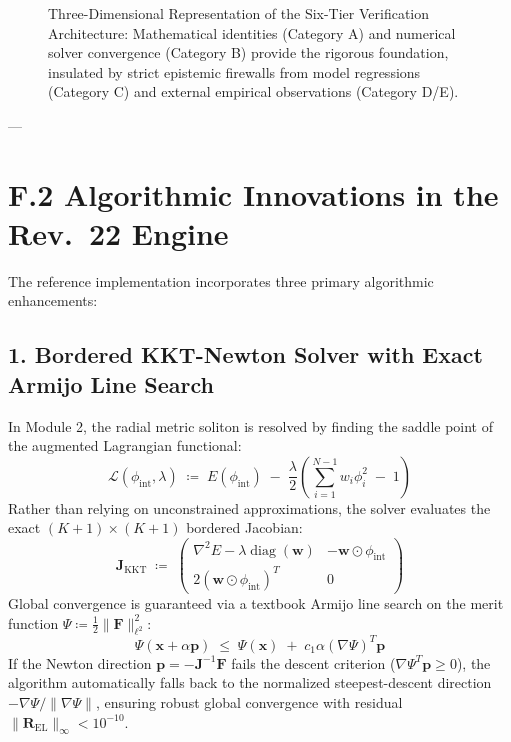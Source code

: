 \documentclass[
    12pt,
    a4paper,
    headings=normal,
    twoside=false,
    open=any,
    parskip=half
]{scrbook}
\begin{document}
\begin{figure}[htbp]
\caption{Three-Dimensional Representation of the Six-Tier Verification Architecture: Mathematical identities (Category A) and numerical solver convergence (Category B) provide the rigorous foundation, insulated by strict epistemic firewalls from model regressions (Category C) and external empirical observations (Category D/E).}
\label{fig:appF_verification_architecture_3d}
\end{figure}

---

\section{F.2 Algorithmic Innovations in the Rev.~22 Engine}
\label{sec:appF_algorithmic_innovations}

The reference implementation incorporates three primary algorithmic enhancements:

\subsection{1. Bordered KKT-Newton Solver with Exact Armijo Line Search}
In Module 2, the radial metric soliton is resolved by finding the saddle point of the augmented Lagrangian functional:
\begin{equation}
\mathcal{L}(\phi_{\text{int}}, \lambda) \;\coloneqq\; E(\phi_{\text{int}}) \;-\; \frac{\lambda}{2} \left( \sum_{i=1}^{N-1} w_i \phi_i^2 \;-\; 1 \right)
\label{eq:appF_kkt_lagrangian}
\end{equation}
Rather than relying on unconstrained approximations, the solver evaluates the exact $(K+1) \times (K+1)$ bordered Jacobian:
\begin{equation}
\mathbf{J}_{\text{KKT}} \;\coloneqq\; \begin{pmatrix}
\nabla^2 E - \lambda \operatorname{diag}(\mathbf{w}) & -\mathbf{w} \odot \phi_{\text{int}} \\
2 (\mathbf{w} \odot \phi_{\text{int}})^T & 0
\end{pmatrix}
\end{equation}
Global convergence is guaranteed via a textbook Armijo line search on the merit function $\Psi \coloneqq \frac{1}{2}\|\mathbf{F}\|_{\ell^2}^2$:
\begin{equation}
\Psi(\mathbf{x} + \alpha \mathbf{p}) \;\le\; \Psi(\mathbf{x}) \;+\; c_1 \alpha \left( \nabla \Psi \right)^T \mathbf{p}
\end{equation}
If the Newton direction $\mathbf{p} = -\mathbf{J}^{-1}\mathbf{F}$ fails the descent criterion ($\nabla\Psi^T \mathbf{p} \ge 0$), the algorithm automatically falls back to the normalized steepest-descent direction $-\nabla\Psi / \|\nabla\Psi\|$, ensuring robust global convergence with residual $\|\mathbf{R}_{\text{EL}}\|_\infty < 10^{-10}$.
\end{document}
